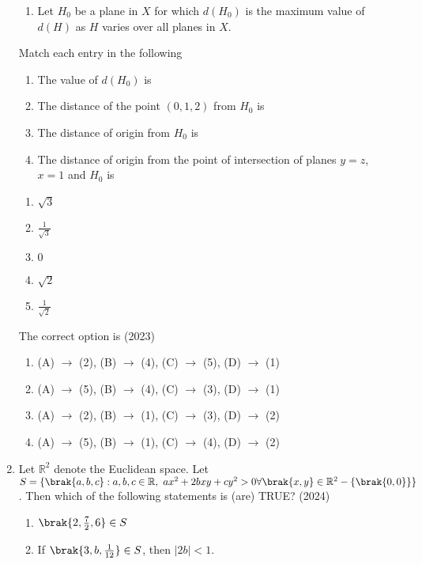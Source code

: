 \begin{enumerate}[label=\thesubsection.\arabic*.,ref=\thesubsection.\theenumi]
\begin{enumerate}
 \item Let $H_0$ be a plane in $X$ for which $d(H_0)$ is the maximum value of $d(H)$ as $H$ varies over all planes in $X$.
\end{enumerate}
Match each entry in the following
\begin{multicols}{2}
\begin{enumerate}[label=(\Alph*)]
     \item The value of $d(H_0)$ is
     \item The distance of the point $(0,1,2)$ from $H_0$ is
     \item The distance of origin from $H_0$ is
     \item The distance of origin from the point of intersection of planes $y=z$, $x=1$ and $H_0$ is
\end{enumerate}
%
\columnbreak
\begin{enumerate}[label=(\arabic*)]
     \item $\sqrt{3}$
     \item $\frac{1}{\sqrt{3}}$
     \item $0$
     \item $\sqrt{2}$
     \item $\frac{1}{\sqrt{2}}$
\end{enumerate}
\end{multicols}
The correct option is
\hfill (2023)
\begin{enumerate}
     \item (A) $\rightarrow$ (2), (B) $\rightarrow$ (4), (C) $\rightarrow$ (5), (D) $\rightarrow$ (1)
     \item (A) $\rightarrow$ (5), (B) $\rightarrow$ (4), (C) $\rightarrow$ (3), (D) $\rightarrow$ (1)
     \item (A) $\rightarrow$ (2), (B) $\rightarrow$ (1), (C) $\rightarrow$ (3), (D) $\rightarrow$ (2)
     \item (A) $\rightarrow$ (5), (B) $\rightarrow$ (1), (C) $\rightarrow$ (4), (D) $\rightarrow$ (2)
\end{enumerate} 
\item Let $ \mathbb{R}^2 $ denote the Euclidean space. Let 
	$ {S} = \{ \brak{a, b, c} : a, b, c \in \mathbb{R}, \ ax^2 + 2bxy + cy^2 > 0 \forall \brak{x, y} \in \mathbb{R}^2 - \{\brak{0,0}\} \} $. Then which of the following statements is (are) TRUE?
\hfill (2024)
\begin{enumerate}
\item $ \brak{ 2, \frac{7}{2}, 6 } \in S $
\item If $ \brak{ 3, b, \frac{1}{12} } \in S $, then $ |2b| < 1 $.

\end{enumerate}
\end{enumerate}
